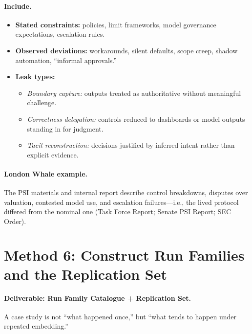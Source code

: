 \paragraph{Include.}
\begin{itemize}
  \item \textbf{Stated constraints:} policies, limit frameworks, model governance expectations, escalation rules.
  \item \textbf{Observed deviations:} workarounds, silent defaults, scope creep, shadow automation, “informal approvals.”
  \item \textbf{Leak types:}
        \begin{itemize}
          \item \emph{Boundary capture:} outputs treated as authoritative without meaningful challenge.
          \item \emph{Correctness delegation:} controls reduced to dashboards or model outputs standing in for judgment.
          \item \emph{Tacit reconstruction:} decisions justified by inferred intent rather than explicit evidence.
        \end{itemize}
\end{itemize}

\paragraph{London Whale example.}
The PSI materials and internal report describe control breakdowns, disputes over valuation, contested model use,
and escalation failures—i.e., the lived protocol differed from the nominal one (Task Force Report; Senate PSI Report; SEC Order).

\section{Method 6: Construct Run Families and the Replication Set}
\label{sec:m6-runs}

\paragraph{Deliverable: Run Family Catalogue + Replication Set.}
A case study is not “what happened once,” but “what tends to happen under repeated embedding.”

